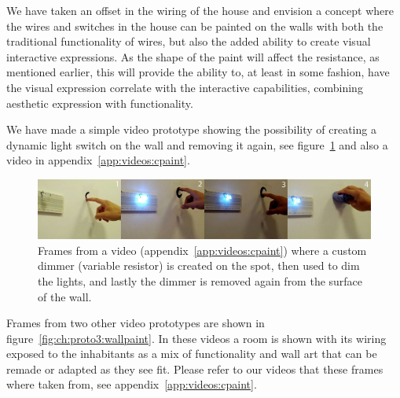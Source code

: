 We have taken an offset in the wiring of the house and envision a concept where the wires and switches in the house can be painted on the walls with both the traditional functionality of wires, but also the added ability to create visual interactive expressions.
As the shape of the paint will affect the resistance, as mentioned earlier, this will provide the ability to, at least in some fashion, have the visual expression correlate with the interactive capabilities, combining aesthetic expression with functionality.

We have made a simple video prototype showing the possibility of creating a dynamic light switch on the wall and removing it again, see figure~\ref{fig:ch:proto3:variable} and also a video in appendix~\ref{app:videos:cpaint}.

\begin{figure}[h]
  \centering
  \includegraphics[width=.9\textwidth]{figures/proto3/light-variable-res}
  \caption{Frames from a video (appendix~\ref{app:videos:cpaint}) where a custom dimmer (variable resistor) is created on the spot, then used to dim the lights, and lastly the dimmer is removed again from the surface of the wall.}
  \label{fig:ch:proto3:variable}
\end{figure}

Frames from two other video prototypes are shown in figure~\ref{fig:ch:proto3:wallpaint}.
In these videos a room is shown with its wiring exposed to the inhabitants as a mix of functionality and wall art that can be remade or adapted as they see fit.
Please refer to our videos that these frames where taken from, see appendix~\ref{app:videos:cpaint}.

